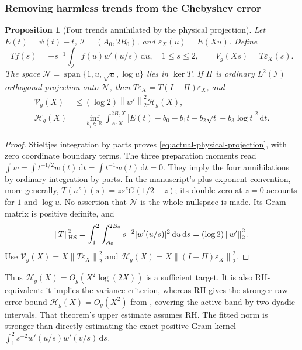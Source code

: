 \documentclass[11pt]{article}
\numberwithin{equation}{section}
\newtheorem{proposition}[theorem]{Proposition}
\theoremstyle{definition}
\theoremstyle{remark}
\newcommand{\norm}[1]{\left\lVert #1\right\rVert}
\newcommand{\dd}{\,\mathrm d}
\begin{document}
\subsubsection{Removing harmless trends from the Chebyshev error}

\begin{proposition}[Four trends annihilated by the physical projection]
\label{prop:actual-fitted-error}
Let \(E(t)=\psi(t)-t\), \(\mathcal I=(A_0,2B_0)\), and
\(\varepsilon_X(u)=E(Xu)\). Define
\begin{equation}\label{eq:actual-physical-projection}
Tf(s)=-s^{-1}\int_{\mathcal I}f(u)w'(u/s)\dd u,
\quad 1\le s\le2,\qquad V_g(Xs)=T\varepsilon_X(s).
\end{equation}
The space \(\mathcal N=\operatorname{span}\{1,u,\sqrt u,\log u\}\)
lies in \(\ker T\). If \(\Pi\) is ordinary \(L^2(\mathcal I)\)
orthogonal projection onto \(\mathcal N\), then
\(T\varepsilon_X=T(I-\Pi)\varepsilon_X\), and
\begin{equation}\label{eq:actual-fitted-comparison}
\begin{split}
\mathcal V_g(X)&\le(\log2)\norm{w'}_2^2\mathcal H_g(X),\\
\mathcal H_g(X)&=\inf_{b_j\in\mathbb R}\int_{A_0X}^{2B_0X}
|E(t)-b_0-b_1t-b_2\sqrt t-b_3\log t|^2\dd t.
\end{split}
\end{equation}
\end{proposition}
\begin{proof}
Stieltjes integration by parts proves
\eqref{eq:actual-physical-projection}, with zero coordinate boundary
terms. The three preparation moments read
\(\int w=\int t^{-1/2}w(t)\dd t=\int t^{-1}w(t)\dd t=0\).
They imply the four annihilations by ordinary integration by parts.
In the manuscript's plus-exponent convention, more generally,
\(T(u^z)(s)=zs^zG(1/2-z)\); its double zero at \(z=0\) accounts
for \(1\) and \(\log u\). No assertion that \(\mathcal N\) is the
whole nullspace is made. Its Gram matrix is positive definite, and
\[
\norm T_{\rm HS}^2=\int_1^2\int_{A_0}^{2B_0}s^{-2}|w'(u/s)|^2
\dd u\dd s=(\log2)\norm{w'}_2^2.
\]
Use \(\mathcal V_g(X)=X\norm{T\varepsilon_X}_2^2\) and
\(\mathcal H_g(X)=X\norm{(I-\Pi)\varepsilon_X}_2^2\).
\end{proof}

Thus \(\mathcal H_g(X)=O_g(X^2\log(2X))\) is a sufficient target.
It is also RH-equivalent: it implies the variance criterion, whereas
RH gives the stronger raw-error bound \(\mathcal H_g(X)=O_g(X^2)\)
from \cite[Theorem~1]{BrentPlattTrudgian}, covering the active band by
two dyadic intervals. That theorem's upper estimate assumes RH.
The fitted norm is stronger than directly estimating the exact positive
Gram kernel \(\int_1^2s^{-2}w'(u/s)w'(v/s)\dd s\).
\end{document}
